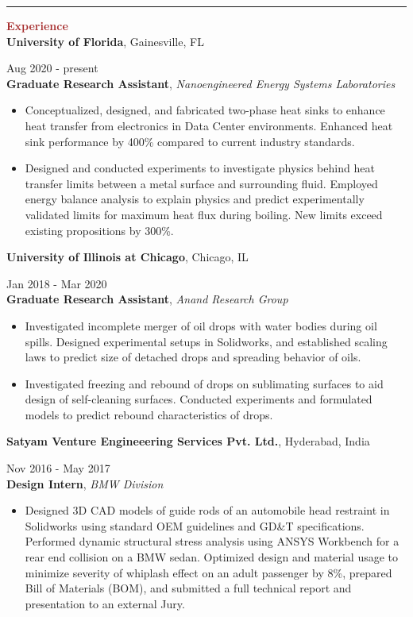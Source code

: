 \documentclass[11pt, letterpaper]{article}
\begin{document}
\noindent \rule[2pt]{\textwidth}{0.5pt}
\noindent \textbf{\large \textcolor{Brown}{Experience}}\vspace{4pt}\\
\textbf{University of Florida}, Gainesville, FL \hfill \raggedright{Aug 2020 - present}\\
\textbf{Graduate Research Assistant}, \textit{Nanoengineered Energy Systems Laboratories}
\begin{itemize}[leftmargin=*]
\setlength\itemsep{-2pt}
\vspace{-5pt}
\item Conceptualized, designed, and fabricated two-phase heat sinks to enhance heat transfer from electronics in Data Center environments. Enhanced heat sink performance by 400\% compared to current industry standards.
\item Designed and conducted experiments to investigate physics behind heat transfer limits between a metal surface and surrounding fluid. Employed energy balance analysis to explain physics and predict experimentally validated limits for maximum heat flux during boiling. New limits exceed existing propositions by 300\%.
\end{itemize}
\textbf{University of Illinois at Chicago}, Chicago, IL \hfill \raggedright{Jan 2018 - Mar 2020}\\
\textbf{Graduate Research Assistant}, \textit{Anand Research Group}
\begin{itemize}[leftmargin=*]
\setlength\itemsep{-2pt}
\vspace{-5pt}
\item Investigated incomplete merger of oil drops with water bodies during oil spills. Designed experimental setups in Solidworks, and established scaling laws to predict size of detached drops and spreading behavior of oils.
\item Investigated freezing and rebound of drops on sublimating surfaces to aid design of self-cleaning surfaces. Conducted experiments and formulated models to predict rebound characteristics of drops.
\end{itemize}
\textbf{Satyam Venture Engineeering Services Pvt. Ltd.}, Hyderabad, India \hfill \raggedright{Nov 2016 - May 2017}\\
\textbf{Design Intern}, \textit{BMW Division}
\begin{itemize}[leftmargin=*]
\setlength\itemsep{-2pt}
\vspace{-5pt}
\item Designed 3D CAD models of guide rods of an automobile head restraint in Solidworks using standard OEM guidelines and GD\&T specifications. Performed dynamic structural stress analysis using ANSYS Workbench for a rear end collision on a BMW sedan. Optimized design and material usage to minimize severity of whiplash effect on an adult passenger by 8\%, prepared Bill of Materials (BOM), and submitted a full technical report and presentation to an external Jury.
\end{itemize}
\end{document}
